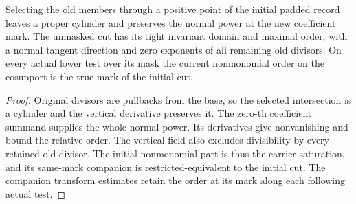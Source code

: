 \begin{theorem}
\label{hir:g1-original-initial-positive-cut-order}
\leanok
Selecting the old members through a positive point of the initial
padded record leaves a proper cylinder and preserves the normal
power at the new coefficient mark. The unmasked cut has its tight
invariant domain and maximal order, with a normal tangent direction
and zero exponents of all remaining old divisors. On every actual
lower test over its mask the current nonmonomial order on the
cosupport is the true mark of the initial cut.
\end{theorem}
\begin{proof}
Original divisors are pullbacks from the base, so the selected
intersection is a cylinder and the vertical derivative preserves it.
The zero-th coefficient summand supplies the whole normal power.
Its derivatives give nonvanishing and bound the relative order.
The vertical field also excludes divisibility by every retained
old divisor. The initial nonmonomial part is thus the carrier
saturation, and its same-mark companion is restricted-equivalent
to the initial cut. The companion transform estimates retain the
order at its mark along each following actual test.
\end{proof}

